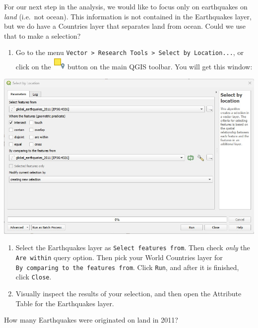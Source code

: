 \documentclass[
  letterpaper,
  DIV=11,
  numbers=noendperiod]{scrreprt}
\providecommand{\tightlist}{%
  \setlength{\itemsep}{0pt}\setlength{\parskip}{0pt}}\usepackage{longtable,booktabs,array}
\begin{document}
For our next step in the analysis, we would like to focus only on
earthquakes on \emph{land} (i.e.~not ocean). This information is not
contained in the Earthquakes layer, but we do have a Countries layer
that separates land from ocean. Could we use that to make a selection?

\begin{enumerate}
\def\labelenumi{(\arabic{enumi})}
\setcounter{enumi}{103}
\tightlist
\item
  Go to the menu
  \texttt{Vector\ \textgreater{}\ Research\ Tools\ \textgreater{}\ Select\ by\ Location...},
  or click on the
  \includegraphics{index_files/mediabag/mAlgorithmSelectLoca.png} button
  on the main QGIS toolbar. You will get this window:
\end{enumerate}

\includegraphics{images/lab_4/lab4_fig1_select_loc.jpg}

\begin{enumerate}
\def\labelenumi{(\arabic{enumi})}
\setcounter{enumi}{104}
\item
  Select the Earthquakes layer as \texttt{Select\ features\ from}. Then
  check \emph{only} the \texttt{Are\ within} query option. Then pick
  your World Countries layer for
  \texttt{By\ comparing\ to\ the\ features\ from}. Click \texttt{Run},
  and after it is finished, click \texttt{Close}.
\item
  Visually inspect the results of your selection, and then open the
  Attribute Table for the Earthquakes layer.
\end{enumerate}

\begin{tcolorbox}[enhanced jigsaw, coltitle=black, toprule=.15mm, breakable, opacitybacktitle=0.6, left=2mm, colback=white, leftrule=.75mm, rightrule=.15mm, colbacktitle=quarto-callout-important-color!10!white, toptitle=1mm, titlerule=0mm, colframe=quarto-callout-important-color-frame, arc=.35mm, bottomtitle=1mm, opacityback=0, bottomrule=.15mm, title=\textcolor{quarto-callout-important-color}{\faExclamation}\hspace{0.5em}{Stop and Think}]

How many Earthquakes were originated on land in 2011?

\end{tcolorbox}
\end{document}
